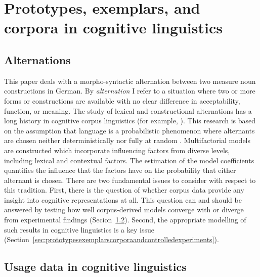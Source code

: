 \section{Prototypes, exemplars, and corpora in cognitive linguistics}
\label{sec:cogocl}

\subsection{Alternations}
\label{sec:alternations}

This paper deals with a morpho-syntactic alternation between two measure noun constructions in German.
By \textit{alternation} I refer to a situation where two or more forms or constructions are available with no clear difference in acceptability, function, or meaning.
The study of lexical and constructional alternations has a long history in cognitive corpus linguistics (for example, \citealp{BresnanEa2007,BresnanHay2010,BresnanFord2010,DivjakArppe2013,Gries2015,NessetJanda2010}).
This research is based on the assumption that language is a probabilistic phenomenon where alternants are chosen neither deterministically nor fully at random \citep{Bresnan2007}.
Multifactorial models are constructed which incorporate influencing factors from diverse levels, including lexical and contextual factors.
The estimation of the model coefficients quantifies the influence that the factors have on the probability that either alternant is chosen.
There are two fundamental issues to consider with respect to this tradition.
First, there is the question of whether corpus data provide any insight into cognitive representations at all.
This question can and should be answered by testing how well corpus-derived models converge with or diverge from experimental findings (Secion~\ref{sec:usagedataincognitivelinguistics}).
Second, the appropriate modelling of such results in cognitive linguistics is a key issue (Section~\ref{sec:prototypesexemplarscorporaandcontrolledexperiments}).

\subsection{Usage data in cognitive linguistics}
\label{sec:usagedataincognitivelinguistics}

